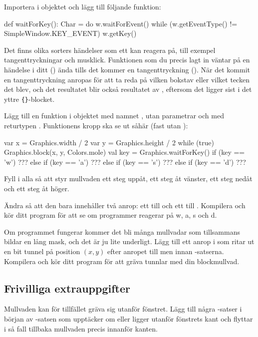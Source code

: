 \Subtask
Importera  i objektet  och lägg till följande funktion:
\begin{Code}
def waitForKey(): Char = {
	do {
		w.waitForEvent()
	} while (w.getEventType() != SimpleWindow.KEY_EVENT)
	w.getKey()
}
\end{Code}
Det finns olika sorters händelser som ett  kan reagera på, till exempel tangenttryckningar och musklick.
Funktionen som du precis lagt in väntar på en händelse i ditt  () ända tills det kommer en tangenttryckning ().
När det kommit en tangenttryckning anropas  för att ta reda på vilken bokstav eller vilket tecken det blev, och det resultatet blir också resultatet av , eftersom det ligger sist i det yttre \texttt{\{\}}-blocket.

\Subtask
Lägg till en funktion i objektet  med namnet , utan parametrar och med returtypen .
Funktionens kropp ska se ut såhär (fast utan ):
\begin{Code}
{
  var x = Graphics.width / 2
  var y = Graphics.height / 2
  while (true) {
    Graphics.block(x, y, Colors.mole)
    val key = Graphics.waitForKey()
    if (key == 'w') ???
    else if (key == 'a') ???
    else if (key == 's') ???
    else if (key == 'd') ???
  }
}
\end{Code}
Fyll i alla  så att  styr mullvaden ett steg uppåt,  ett steg åt vänster,  ett steg nedåt och  ett steg åt höger.

\Subtask
Ändra  så att den bara innehåller två anrop: ett till  och ett till .
Kompilera och kör ditt program för att se om programmer reagerar på w, a, s och d.

\Subtask
Om programmet fungerar kommer det bli många mullvadar som tillsammans bildar en lång mask, och det är ju lite underligt.
Lägg till ett anrop i  som ritar ut en bit tunnel på position $(x, y)$ efter anropet till  men innan -satserna.
Kompilera och kör ditt program för att gräva tunnlar med din blockmullvad.

\subsection{Frivilliga extrauppgifter}

\Task
Mullvaden kan för tillfället gräva sig utanför fönstret.
Lägg till några -satser i början av -satsen som upptäcker om  eller  ligger utanför fönstrets kant och flyttar i så fall tillbaka mullvaden precis innanför kanten.

